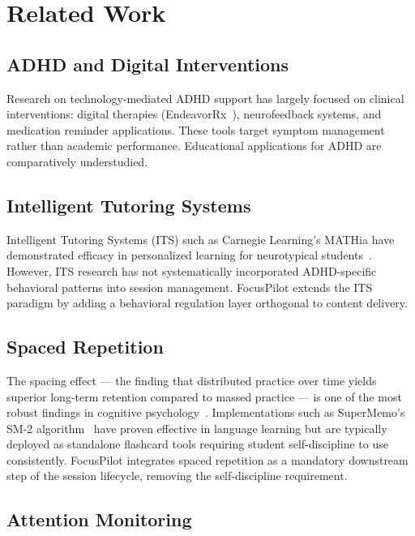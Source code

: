 \documentclass[conference]{IEEEtran}
\begin{document}
\section{Related Work}

\subsection{ADHD and Digital Interventions}

Research on technology-mediated ADHD support has largely focused on clinical interventions: digital therapies (EndeavorRx~\cite{kollins2020novel}), neurofeedback systems, and medication reminder applications. These tools target symptom management rather than academic performance. Educational applications for ADHD are comparatively understudied.

\subsection{Intelligent Tutoring Systems}

Intelligent Tutoring Systems (ITS) such as Carnegie Learning's MATHia have demonstrated efficacy in personalized learning for neurotypical students~\cite{vanlehn2011relative}. However, ITS research has not systematically incorporated ADHD-specific behavioral patterns into session management. FocusPilot extends the ITS paradigm by adding a behavioral regulation layer orthogonal to content delivery.

\subsection{Spaced Repetition}

The spacing effect — the finding that distributed practice over time yields superior long-term retention compared to massed practice — is one of the most robust findings in cognitive psychology~\cite{ebbinghaus1885memory,cepeda2006distributed}. Implementations such as SuperMemo's SM-2 algorithm~\cite{wozniak1990optimization} have proven effective in language learning but are typically deployed as standalone flashcard tools requiring student self-discipline to use consistently. FocusPilot integrates spaced repetition as a mandatory downstream step of the session lifecycle, removing the self-discipline requirement.

\subsection{Attention Monitoring}
\end{document}
